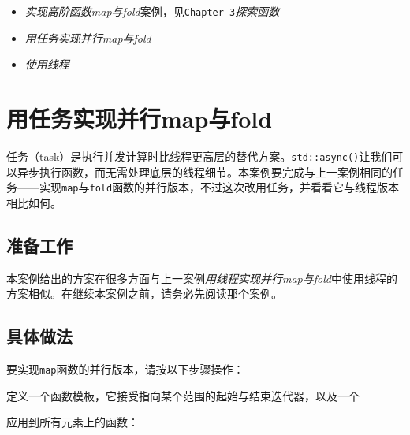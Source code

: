 
\begin{itemize}
\item \textit{实现高阶函数map与fold}案例，见\texttt{Chapter 3}\textit{探索函数}



\item \textit{用任务实现并行map与fold}



\item \textit{使用线程}

\end{itemize}



\section{用任务实现并行map与fold}



任务（task）是执行并发计算时比线程更高层的替代方案。\texttt{std::\allowbreak{}async()}让我们可以异步执行函数，而无需处理底层的线程细节。本案例要完成与上一案例相同的任务——实现\texttt{map}与\texttt{fold}函数的并行版本，不过这次改用任务，并看看它与线程版本相比如何。



\subsection{准备工作}



本案例给出的方案在很多方面与上一案例\textit{用线程实现并行map与fold}中使用线程的方案相似。在继续本案例之前，请务必先阅读那个案例。



\subsection{具体做法}



要实现\texttt{map}函数的并行版本，请按以下步骤操作：



定义一个函数模板，它接受指向某个范围的起始与结束迭代器，以及一个



应用到所有元素上的函数：



